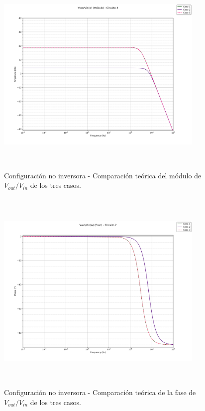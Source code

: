 \begin{figure}[H] %
\centering
\includegraphics[width=10cm,height=10cm,keepaspectratio]{../EJ1/00GRAFICOS/teoricos/circ2voviw.png}
\caption{Configuración no inversora - Comparaci\'on te\'orica del m\'odulo de$V_{out}/V_{in}$ de los tres casos.}
\label{c2voviTeoMod}
\end{figure}

\begin{figure}[H] %
\centering
\includegraphics[width=10cm,height=10cm,keepaspectratio]{../EJ1/00GRAFICOS/teoricos/circ2vovifasew.png}
\caption{Configuración no inversora - Comparaci\'on te\'orica de la fase de $V_{out}/V_{in}$ de los tres casos.}
\label{c2voviTeoPh}
\end{figure}






